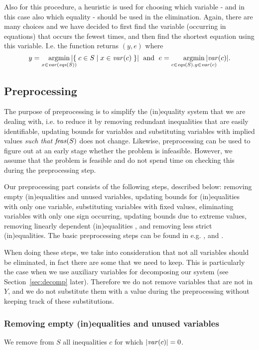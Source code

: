 %
Also for this procedure, a heuristic is used for choosing which variable - and in this case also which equality - should be used in the elimination. Again, there are many choices and we have decided to 
first find the variable (occurring in equations) that occurs the fewest times, and then find the shortest equation using this variable. I.e. the function  returns $(y,e)$ where
\[
y = \smashoperator[r]{\argmin_{x\in \var(\eqs(S))}}|\set{c\in S}{x\in \var(c)}|\; \text{ and }\; e = \smashoperator[r]{\argmin_{c\in \eqs(S).y\in \var(c)}}|\var(c)|.
\] 
%
\subsection{Preprocessing}
The purpose of preprocessing is to simplify the (in)equality system that we are dealing with, i.e. to reduce it by removing redundant inequalities that are easily identifiable, updating bounds for variables and substituting variables with implied values \emph{such that} $\mathit{feas}(S)$ does not change. {Likewise, preprocessing can be used to figure out at an early stage whether the problem is infeasible. However, we assume that the problem is feasible and do not spend time on checking this during the preprocessing step.}

Our preprocessing part consists of the following steps, described below: removing empty (in)equalities and unused variables, updating bounds for (in)\-equali\-ties with only one variable, substituting variables with fixed values, eliminating variables with only one sign occurring, updating bounds due to extreme values, removing linearly dependent (in)equalities \cite{lassez93}, and removing less strict (in)equalities. The basic preprocessing steps can be found in e.g. \cite{brearley75}, \cite{andersen95} and \cite{maros}.

When doing these steps, we take into consideration that not all variables should be eliminated, in fact there are some that we need to keep. This is particularly the case when we use auxiliary variables for decomposing our system (see Section~\ref{sec:decomp} later). Therefore we do not remove variables that are not in $Y$, and we do not substitute them with a value during the preprocessing {without keeping track of these substitutions}. 
%
\subsubsection{Removing empty (in)equalities and unused variables}\label{para:emptyIneqs} 
We remove from $S$ all inequalities $c$ for which $|\mathit{var}(c)| = 0$.  

